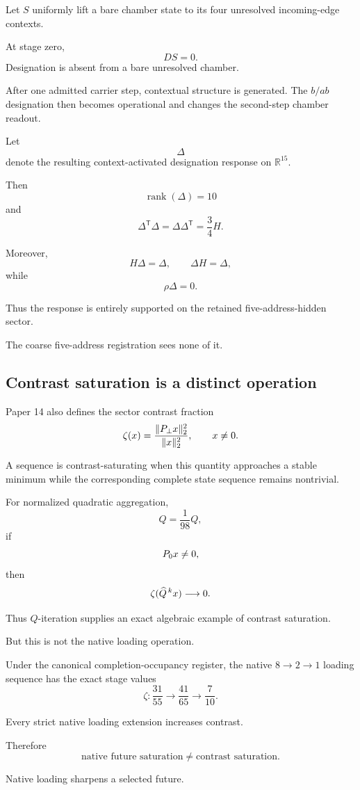 Let \(S\) uniformly lift a bare chamber state to its four unresolved
incoming-edge contexts.

At stage zero,
\[
DS=0.
\]
Designation is absent from a bare unresolved chamber.

After one admitted carrier step, contextual structure is generated.
The \(b/ab\) designation then becomes operational and changes the
second-step chamber readout.

Let
\[
\Delta
\]
denote the resulting context-activated designation response on
\(\mathbb R^{15}\).

Then
\[
\operatorname{rank}(\Delta)=10
\]
and
\[
\Delta^{\mathsf T}\Delta
=
\Delta\Delta^{\mathsf T}
=
\frac34H.
\]

Moreover,
\[
H\Delta=\Delta,
\qquad
\Delta H=\Delta,
\]
while
\[
\rho\Delta=0.
\]

Thus the response is entirely supported on the retained
five-address-hidden sector.

The coarse five-address registration sees none of it.

\subsection{Contrast saturation is a distinct operation}

Paper 14 also defines the sector contrast fraction
\[
\zeta(x)
=
\frac{\|P_{\perp} x\|_2^2}{\|x\|_2^2},
\qquad
x\neq0.
\]

A sequence is contrast-saturating when this quantity approaches a
stable minimum while the corresponding complete state sequence
remains nontrivial.

For normalized quadratic aggregation,
\[
\widehat Q=\frac1{98}Q,
\]
if
\[
P_{0} x\neq0,
\]
then
\[
\zeta(\widehat Q^{\,k}x)\longrightarrow0.
\]

Thus \(\widehat Q\)-iteration supplies an exact algebraic example of
contrast saturation.

But this is not the native loading operation.

Under the canonical completion-occupancy register, the native
\(8\to2\to1\) loading sequence has the exact stage values
\[
\zeta:
\frac{31}{55}
\longrightarrow
\frac{41}{65}
\longrightarrow
\frac{7}{10}.
\]

Every strict native loading extension increases contrast.

Therefore
\[
\text{native future saturation}
\neq
\text{contrast saturation}.
\]

Native loading sharpens a selected future.

